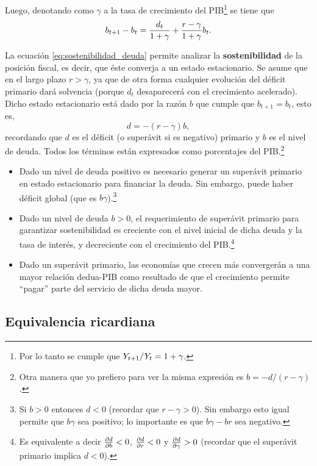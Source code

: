 \documentclass[DeGregorioResumen]{subfiles}
\begin{document}
Luego, denotando como $\gamma $ a la tasa de crecimiento del PIB\footnote{Por lo tanto se cumple que ${Y}_{t+1}/Y_t = 1+\gamma$.} se tiene que
\begin{equation}
{b}_{t+1}-b_t = \frac{d_t}{1+\gamma}+\frac{r-\gamma}{1+\gamma}b_t.
\label{eq:sostenibilidad_deuda}
\end{equation}
 
La ecuación \eqref{eq:sostenibilidad_deuda} permite analizar la \textbf{sostenibilidad} de la posición fiscal, es decir, que éste converja a un estado estacionario. Se asume que en el largo plazo $r>\gamma $, ya que de otra forma cualquier evolución del déficit primario dará solvencia (porque $d_t $ desaparecerá con el crecimiento acelerado). Dicho estado estacionario está dado por la razón $b$ que cumple que $b_{t+1}=b_t$, esto es,
\begin{equation}
d=-(r-\gamma)b,
\end{equation}
recordando que $d$ es el déficit (o superávit si es negativo) primario y $b$ es el nivel de deuda. Todos los términos están expresados como porcentajes del PIB.\footnote{Otra manera que yo prefiero para ver la misma expresión es $b=-d/(r-\gamma)$.}

\begin{itemize}
\item Dado un nivel de deuda positivo es necesario generar un superávit primario en estado estacionario para financiar la deuda. Sin embargo, puede haber déficit global (que es $b\gamma$).\footnote{Si $b>0$ entonces $d<0$ (recordar que $r-\gamma>0$). Sin embargo esto igual permite que $b\gamma$ sea positivo; lo importante es que $b\gamma-br$ sea negativo.}
\item Dado un nivel de deuda $b>0$, el requerimiento de superávit primario para garantizar sostenibilidad es creciente con el nivel inicial de dicha deuda y la tasa de interés, y decreciente con el crecimiento del PIB.\footnote{Es equivalente a decir $\frac{\partial d}{\partial b}<0$, $\frac{\partial d}{\partial r}<0$ y $\frac{\partial d}{\partial\gamma}>0$ (recordar que el superávit primario implica $d<0$).}
\item Dado un superávit primario, las economías que crecen más convergerán a una mayor relación dedua-PIB como resultado de que el crecimiento permite ``pagar'' parte del servicio de dicha deuda mayor.
\end{itemize}

\subsection{Equivalencia ricardiana}
\end{document}
